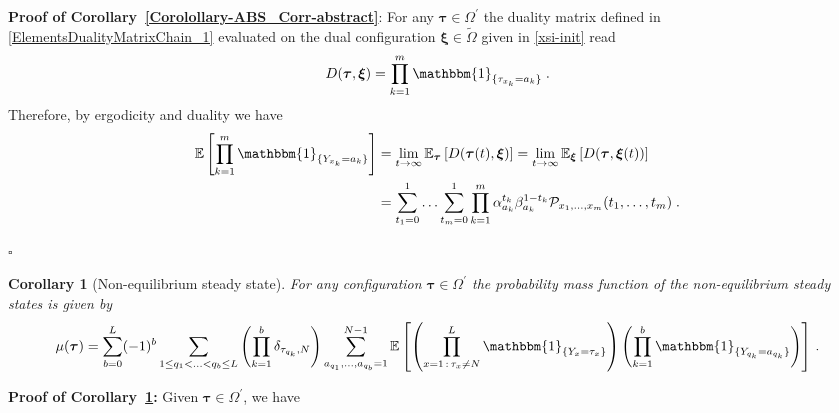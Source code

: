 \documentclass[10pt]{article}
\numberwithin{equation}{section}
\numberwithin{equation}{subsection}
\newtheorem{corollary}{Corollary}
\newcommand{\dt}{\;.}
\begin{document}
\textbf{Proof of Corollary~\ref{Corolollary-ABS_Corr-abstract}}:
For any $\bm{\tau}\in \Omega^{'}$ the duality matrix defined in \eqref{ElementsDualityMatrixChain_1} evaluated on the dual configuration $\bm{\xi}\in\widetilde{\Omega}$ given in \eqref{xsi-init} read
\begin{equation}
	D(\bm{\tau},\bm{\xi})%
	=\prod_{k=1}^{m}\mathbbm{1}_{\{\tau_{x_{k}}=a_{k}\}}\dt
\end{equation}
Therefore, by ergodicity and duality  we have 
\begin{equation}\label{CorrelationByABS-prob}
	\begin{split}
\mathbb{E}\left[\prod_{k=1}^{m}\mathbbm{1}_{\{Y_{x_{k}}=a_{k}\}}\right]&=\lim_{t\to \infty}\mathbb{E}_{\bm{\tau}}\left[D(\bm{\tau}(t),\bm{{\xi}})\right]=\lim_{t\to \infty}\mathbb{E}_{\bm{\xi}}\left[D(\bm{\tau},\bm{{\xi}}(t))\right]
	\\&=\sum_{t_{1}=0}^{1}\ldots \sum_{t_{m}=0}^{1}\prod_{k=1}^{m}\alpha_{a_{k}}^{t_{k}}\beta_{a_{k}}^{1-t_{k}}\mathcal{P}_{x_{1},\ldots,x_{m}}(t_{1},\ldots,t_{m})\dt
\end{split}
\end{equation}
\begin{flushright}
	$\square$
\end{flushright} 
    \begin{corollary}[Non-equilibrium steady state]\label{Corollary-NESS-ABS}
For any configuration $\bm{\tau}\in \Omega^{'}$  the probability mass function of the non-equilibrium steady states is given by 
\begin{equation}\label{implicit-mass-function}
	\mu(\bm{\tau})=\sum_{b=0}^{L}(-1)^{b}\sum_{1\leq q_{1}<\ldots<q_{b}\leq L}\left(\prod_{k=1}^{b}\delta_{\tau_{q_{k}},N}\right)\sum_{a_{q_{1}},\ldots,a_{q_{b}}=1}^{N-1}
	\mathbb{E}\left[\left( \prod_{x=1\,:\,\tau_{x}\neq N}^{L}\mathbbm{1}_{\{Y_{x}=\tau_{x}\}}\right) \left(\prod_{k=1}^{b}\mathbbm{1}_{\{Y_{q_{k}}=a_{q_{k}}\}}\right)\right]\,.
\end{equation}
\end{corollary}
\textbf{Proof of Corollary~\ref{Corollary-NESS-ABS}:}
Given $\bm{\tau}\in \Omega^{'}$,  we have 
\end{document}
